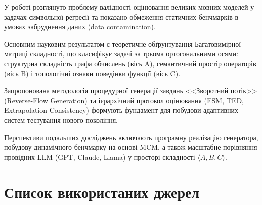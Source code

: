 \documentclass[11pt]{article}
\begin{document}
У роботі розглянуто проблему валідності оцінювання великих мовних моделей у задачах символьної регресії та показано обмеження статичних бенчмарків в умовах забруднення даних (data contamination).

Основним науковим результатом є теоретичне обґрунтування Багатовимірної матриці складності, що класифікує задачі за трьома ортогональними осями: структурна складність графа обчислень (вісь A), семантичний простір операторів (вісь B) і топологічні ознаки поведінки функції (вісь C).

Запропонована методологія процедурної генерації завдань <<Зворотний потік>> (Reverse-Flow Generation) та ієрархічний протокол оцінювання (ESM, TED, Extrapolation Consistency) формують фундамент для побудови адаптивних систем тестування нового покоління.

Перспективи подальших досліджень включають програмну реалізацію генератора, побудову динамічного бенчмарку на основі MCM, а також масштабне порівняння провідних LLM (GPT, Claude, Llama) у просторі складності $\langle A,B,C\rangle$.

\section*{Список використаних джерел}
\end{document}
